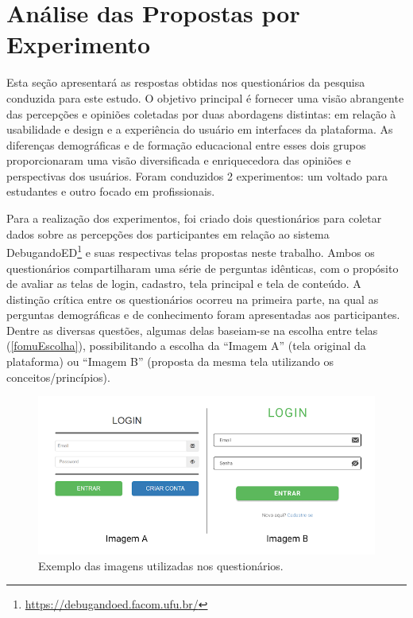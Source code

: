 \section{Análise das Propostas por Experimento}

Esta seção apresentará as respostas obtidas nos questionários da pesquisa conduzida para este estudo. O objetivo principal é fornecer uma visão abrangente das percepções e opiniões coletadas por duas abordagens distintas: em relação à usabilidade e design e a experiência do usuário em interfaces da plataforma. As diferenças demográficas e de formação educacional entre esses dois grupos proporcionaram uma visão diversificada e enriquecedora das opiniões e perspectivas dos usuários. Foram conduzidos 2 experimentos: um voltado para estudantes e outro focado em profissionais. 

Para a realização dos experimentos, foi criado dois questionários para coletar dados sobre as percepções dos participantes em relação ao sistema DebugandoED\footnote{\url{https://debugandoed.facom.ufu.br/}} e suas respectivas telas propostas neste trabalho. Ambos os questionários compartilharam uma série de perguntas idênticas, com o propósito de avaliar as telas de login, cadastro, tela principal e tela de conteúdo. A distinção crítica entre os questionários ocorreu na primeira parte, na qual as perguntas demográficas e de conhecimento foram apresentadas aos participantes. Dentre as diversas questões, algumas delas baseiam-se na escolha entre telas (\autoref{fomuEscolha}), possibilitando a escolha da ``Imagem A'' (tela original da plataforma) ou ``Imagem B'' (proposta da mesma tela utilizando os conceitos/princípios).

\begin{figure}[ht]
    \begin{center}
	    \includegraphics[scale=0.4]{figs/form_compara.png}
	\end{center}
    \caption{\label{fomuEscolha}Exemplo das imagens utilizadas nos questionários.}
\end{figure}


